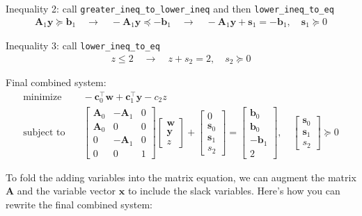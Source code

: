 \documentclass[11pt]{article}
\begin{document}
Inequality 2: call \texttt{greater\_ineq\_to\_lower\_ineq} and then \texttt{lower\_ineq\_to\_eq}
\begin{align}
    \textbf{A}_1 \textbf{y} \succeq \textbf{b}_1 \quad \to \quad -\textbf{A}_1 \textbf{y} \preceq -\textbf{b}_1 \quad \to \quad -\textbf{A}_1 \textbf{y} + \textbf{s}_1 = -\textbf{b}_1, \quad \textbf{s}_1 \succeq 0
\end{align}

Inequality 3: call \texttt{lower\_ineq\_to\_eq}
\begin{align}
    z \leq 2 \quad \to \quad z + s_2 = 2, \quad s_2 \succeq 0
\end{align}


Final combined system:
\begin{align}
    \text{minimize} & \quad -\textbf{c}_0^\top \textbf{w} + \textbf{c}_1^\top \textbf{y} - c_2 z \\
    \text{subject to} & \quad 
    \begin{bmatrix}
        \textbf{A}_0 & -\textbf{A}_1 & 0 \\
        \textbf{A}_0 & 0 & 0 \\
        0 & -\textbf{A}_1 & 0 \\
        0 & 0 & 1
    \end{bmatrix}
    \begin{bmatrix}
        \textbf{w} \\ \textbf{y} \\ z
    \end{bmatrix}
    +
    \begin{bmatrix}
        0 \\ \textbf{s}_0 \\ \textbf{s}_1 \\ s_2
    \end{bmatrix}
    =
    \begin{bmatrix}
        \textbf{b}_0 \\ \textbf{b}_0 \\ -\textbf{b}_1 \\ 2
    \end{bmatrix}, \quad
    \begin{bmatrix}
        \textbf{s}_0 \\ \textbf{s}_1 \\ s_2
    \end{bmatrix}
    \succeq 0
\end{align}

To fold the adding variables into the matrix equation, we can augment the matrix \(\textbf{A}\) and the variable vector \(\textbf{x}\) to include the slack variables. Here's how you can rewrite the final combined system:
\end{document}
